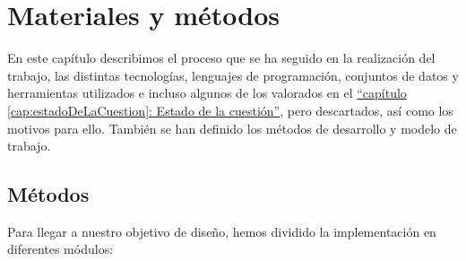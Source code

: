 \chapter{Materiales y métodos}
\label{cap:Materiales y metodos}



En este capítulo describimos el proceso que se ha seguido en la realización del trabajo, las distintas tecnologías, lenguajes de programación, conjuntos de datos y herramientas utilizados e incluso algunos de los valorados en el \hyperref[cap:estadoDeLaCuestion]{``capítulo \ref*{cap:estadoDeLaCuestion}: Estado de la cuestión''}, pero descartados, así como los motivos para ello. También se han definido los métodos de desarrollo y modelo de trabajo. \\


\section{Métodos}

Para llegar a nuestro objetivo de diseño, hemos dividido la implementación en diferentes módulos:

